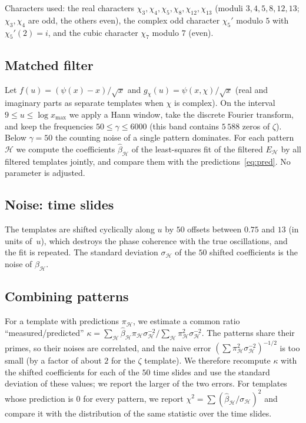 \documentclass[11pt]{amsart}
\theoremstyle{remark}
\newcommand{\cH}{\mathcal{H}}
\begin{document}
Characters used: the real characters $\chi_3,\chi_4,\chi_5,\chi_8,\chi_{12},\chi_{13}$ (moduli $3,4,5,8,12,13$; $\chi_3,\chi_4$ are odd, the others even), the complex odd character $\chi_5'$ modulo $5$ with $\chi_5'(2)=i$, and the cubic character $\chi_7$ modulo $7$ (even).

\subsection*{Matched filter}
Let $f(u)=(\psi(x)-x)/\sqrt x$ and $g_\chi(u)=\psi(x,\chi)/\sqrt x$ (real and imaginary parts as separate templates when $\chi$ is complex). On the interval $9\le u\le\log x_{\max}$ we apply a Hann window, take the discrete Fourier transform, and keep the frequencies $50\le\gamma\le6000$ (this band contains $5\,588$ zeros of $\zeta$). Below $\gamma=50$ the counting noise of a single pattern dominates. For each pattern $\cH$ we compute the coefficients $\hat\beta_\cH$ of the least-squares fit of the filtered $E_\cH$ by all filtered templates jointly, and compare them with the predictions~\eqref{eq:pred}. No parameter is adjusted.

\subsection*{Noise: time slides}
The templates are shifted cyclically along $u$ by $50$ offsets between $0.75$ and $13$ (in units of~$u$), which destroys the phase coherence with the true oscillations, and the fit is repeated. The standard deviation $\sigma_\cH$ of the $50$ shifted coefficients is the noise of $\hat\beta_\cH$.

\subsection*{Combining patterns}
For a template with predictions $\pi_\cH$, we estimate a common ratio ``measured/predicted''
$\kappa=\sum_\cH\hat\beta_\cH\pi_\cH\sigma_\cH^{-2}\big/\sum_\cH\pi_\cH^2\sigma_\cH^{-2}$.
The patterns share their primes, so their noises are correlated, and the naive error $(\sum\pi_\cH^2\sigma_\cH^{-2})^{-1/2}$ is too small (by a factor of about $2$ for the $\zeta$ template). We therefore recompute $\kappa$ with the shifted coefficients for each of the $50$ time slides and use the standard deviation of these values; we report the larger of the two errors. For templates whose prediction is $0$ for every pattern, we report $\chi^2=\sum(\hat\beta_\cH/\sigma_\cH)^2$ and compare it with the distribution of the same statistic over the time slides.
\end{document}
